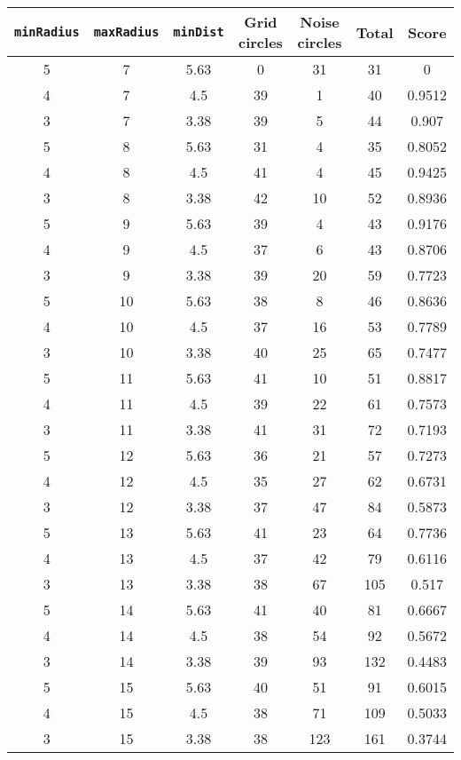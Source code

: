 \documentclass[letterpaper, 12pt]{article}
\begin{document}
\begin{longtable}{|c|c|c|c|c|c|c|}
\hline
\textbf{\texttt{minRadius}} & \textbf{\texttt{maxRadius}} & \textbf{\texttt{minDist}} & \textbf{Grid circles} & \textbf{Noise circles} & \textbf{Total} & \textbf{Score} \\
\hline
5 & 7 & 5.63 & 0 & 31 & 31 & 0 \\
\hline
4 & 7 & 4.5 & 39 & 1 & 40 & 0.9512 \\
\hline
3 & 7 & 3.38 & 39 & 5 & 44 & 0.907 \\
\hline
5 & 8 & 5.63 & 31 & 4 & 35 & 0.8052 \\
\hline
4 & 8 & 4.5 & 41 & 4 & 45 & 0.9425 \\
\hline
3 & 8 & 3.38 & 42 & 10 & 52 & 0.8936 \\
\hline
5 & 9 & 5.63 & 39 & 4 & 43 & 0.9176 \\
\hline
4 & 9 & 4.5 & 37 & 6 & 43 & 0.8706 \\
\hline
3 & 9 & 3.38 & 39 & 20 & 59 & 0.7723 \\
\hline
5 & 10 & 5.63 & 38 & 8 & 46 & 0.8636 \\
\hline
4 & 10 & 4.5 & 37 & 16 & 53 & 0.7789 \\
\hline
3 & 10 & 3.38 & 40 & 25 & 65 & 0.7477 \\
\hline
5 & 11 & 5.63 & 41 & 10 & 51 & 0.8817 \\
\hline
4 & 11 & 4.5 & 39 & 22 & 61 & 0.7573 \\
\hline
3 & 11 & 3.38 & 41 & 31 & 72 & 0.7193 \\
\hline
5 & 12 & 5.63 & 36 & 21 & 57 & 0.7273 \\
\hline
4 & 12 & 4.5 & 35 & 27 & 62 & 0.6731 \\
\hline
3 & 12 & 3.38 & 37 & 47 & 84 & 0.5873 \\
\hline
5 & 13 & 5.63 & 41 & 23 & 64 & 0.7736 \\
\hline
4 & 13 & 4.5 & 37 & 42 & 79 & 0.6116 \\
\hline
3 & 13 & 3.38 & 38 & 67 & 105 & 0.517 \\
\hline
5 & 14 & 5.63 & 41 & 40 & 81 & 0.6667 \\
\hline
4 & 14 & 4.5 & 38 & 54 & 92 & 0.5672 \\
\hline
3 & 14 & 3.38 & 39 & 93 & 132 & 0.4483 \\
\hline
5 & 15 & 5.63 & 40 & 51 & 91 & 0.6015 \\
\hline
4 & 15 & 4.5 & 38 & 71 & 109 & 0.5033 \\
\hline
3 & 15 & 3.38 & 38 & 123 & 161 & 0.3744 \\

\end{longtable}
\end{document}

